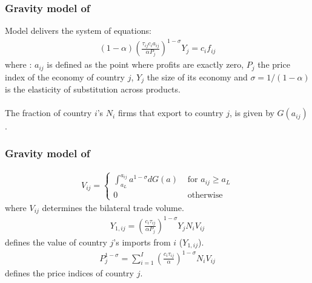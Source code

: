  \begin{frame}
    \frametitle{Gravity model of \cite{helpman2008estimating}}
    Model delivers the system of equations:
    \begin{align}
        (1-\alpha)\left(\frac{\tau_{i j} c_{i} a_{i j}}{\alpha P_{j}}\right)^{1-\sigma} Y_{j}=c_{i} f_{i j}
        \label{eq:MHR1}
    \end{align}
    \noindent where : $a_{ij}$ is defined as the point where profits are exactly zero, $P_j$ the price index of the economy of country $j$, $Y_j$ the size of its economy and $\sigma = 1/(1-\alpha)$ is the elasticity of substitution across products. 
    \\~\\
    The fraction of country $i$'s $N_i$ firms that export to country $j$, is given by $G(a_{ij})$.
  \end{frame}

  \begin{frame}
    \frametitle{Gravity model of \cite{helpman2008estimating}}
    \begin{align}
        V_{i j}=\left\{\begin{array}{cc}
    \int_{a_{L}}^{a_{i j}} a^{1-\sigma} d G(a) & \text { for } a_{i j} \geq a_{L} \\
    0 & \text { otherwise }
    \end{array}\right.
    \label{eq:MHR2}
    \end{align}
    \noindent where $V_{ij}$ determines the bilateral trade volume. 
    \begin{align}
        Y_{1,i j}=\left(\frac{c_{i} \tau_{i j}}{\alpha P_{j}}\right)^{1-\sigma} Y_{j} N_{i} V_{i j}
        \label{eq:MHR3}
    \end{align}
    defines the value of country $j$'s imports from $i$ ($Y_{1,ij}$). 
    \begin{align} \label{eq:MHR4}
        P_{j}^{1-\sigma}=\sum_{i=1}^{I}\left(\frac{c_{i} \tau_{i j}}{\alpha}\right)^{1-\sigma} N_{i} V_{i j}
    \end{align}
    defines the price indices of country $j$.
  \end{frame}

